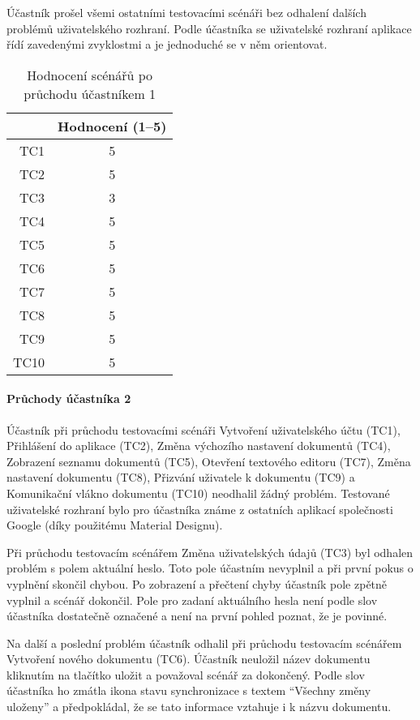 Účastník prošel všemi ostatními testovacími scénáři bez odhalení dalších problémů uživatelského rozhraní.
Podle účastníka se uživatelské rozhraní aplikace řídí zavedenými zvyklostmi a je jednoduché se v něm orientovat.

\begin{table}[ht!]
    \centering
    \caption{Hodnocení scénářů po průchodu účastníkem 1}
    \label{tab:poPrůchoduÚčastníkem1}
    \begin{tabular}{r|c}
        & Hodnocení (1--5) \\ \hline
        TC1 & 5 \\
        TC2 & 5 \\
        TC3 & 3 \\
        TC4 & 5 \\
        TC5 & 5 \\
        TC6 & 5 \\
        TC7 & 5 \\
        TC8 & 5 \\
        TC9 & 5 \\
        TC10 & 5 \\
    \end{tabular}
\end{table}


\paragraph{Průchody účastníka 2}

Účastník při průchodu testovacími scénáři Vytvoření uživatelského účtu (TC1), Přihlášení do aplikace (TC2), Změna výchozího nastavení dokumentů (TC4), Zobrazení seznamu dokumentů (TC5),  Otevření textového editoru (TC7), Změna nastavení dokumentu (TC8), Přizvání uživatele k dokumentu (TC9) a Komunikační vlákno dokumentu (TC10) neodhalil žádný problém.
Testované uživatelské rozhraní bylo pro účastníka známe z ostatních aplikací společnosti Google (díky použitému Material Designu).

Při průchodu testovacím scénářem Změna uživatelských údajů (TC3) byl odhalen problém s polem aktuální heslo.
Toto pole účastním nevyplnil a při první pokus o vyplnění skončil chybou.
Po zobrazení a přečtení chyby účastník pole zpětně vyplnil a scénář dokončil.
Pole pro zadaní aktuálního hesla není podle slov účastníka dostatečně označené a není na první pohled poznat, že je povinné.

Na další a poslední problém účastník odhalil při průchodu testovacím scénářem Vytvoření nového dokumentu (TC6).
Účastník neuložil název dokumentu kliknutím na tlačítko uložit a považoval scénář za dokončený.
Podle slov účastníka ho zmátla ikona stavu synchronizace s textem \enquote{Všechny změny uloženy} a předpokládal, že se tato informace vztahuje i k názvu dokumentu.

